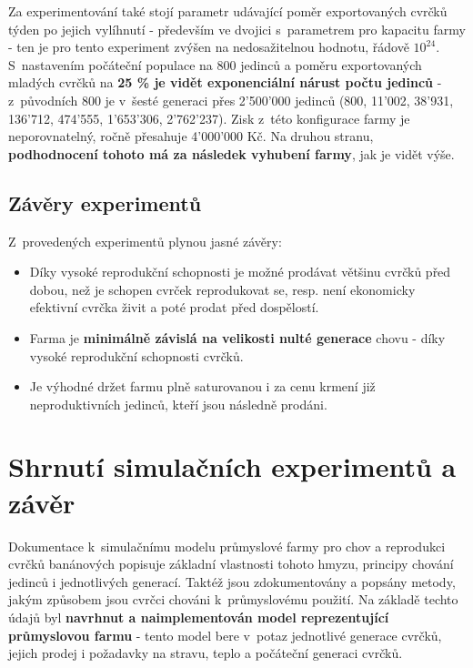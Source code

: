 \documentclass[11pt, a4paper, titlepage]{article}
\begin{document}
    Za experimentování také stojí parametr udávající poměr exportovaných cvrčků týden po jejich vylíhnutí - především ve
    dvojici s~parametrem pro kapacitu farmy - ten je pro tento experiment zvýšen na nedosažitelnou hodnotu, řádově $10^24$.
    S~nastavením počáteční populace na 800 jedinců a poměru exportovaných mladých cvrčků na \textbf{25 \% je vidět
    exponenciální nárust počtu jedinců} - z~původních 800 je v~šesté generaci přes 2'500'000 jedinců (800, 11'002,
    38'931, 136'712, 474'555, 1'653'306, 2'762'237). Zisk z~této konfigurace farmy je neporovnatelný, ročně přesahuje
    4'000'000 Kč. Na druhou stranu, \textbf{podhodnocení tohoto má za následek vyhubení farmy}, jak je vidět výše.

    \subsection{Závěry experimentů}

    Z~provedených experimentů plynou jasné závěry:

    \begin{itemize}
        \item Díky vysoké reprodukční schopnosti je možné prodávat většinu cvrčků před dobou, než je schopen cvrček
        reprodukovat se, resp. není ekonomicky efektivní cvrčka živit a poté prodat před dospělostí.
        \item Farma je \textbf{minimálně závislá na velikosti nulté generace} chovu - díky vysoké reprodukční schopnosti cvrčků.
        \item Je výhodné držet farmu plně saturovanou i za cenu krmení již neproduktivních jedinců, kteří jsou následně
        prodáni.
    \end{itemize}

    \section{Shrnutí simulačních experimentů a závěr}

    Dokumentace k~simulačnímu modelu průmyslové farmy pro chov a reprodukci cvrčků banánových popisuje základní vlastnosti
    tohoto hmyzu, principy chování jedinců i jednotlivých generací. Taktéž jsou zdokumentovány a popsány metody, jakým
    způsobem jsou cvrčci chováni k~průmyslovému použití. Na základě techto údajů byl \textbf{navrhnut a naimplementován model
    reprezentující průmyslovou farmu} - tento model bere v~potaz jednotlivé generace cvrčků, jejich prodej i požadavky na
    stravu, teplo a počáteční generaci cvrčků.
\end{document}
